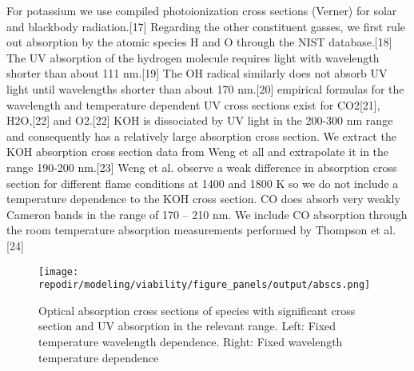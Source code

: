 For potassium we use compiled photoionization cross sections (Verner) for solar and blackbody radiation.{[}17{]} Regarding the other constituent gasses, we first rule out absorption by the atomic species H and O through the NIST database.{[}18{]} The UV absorption of the hydrogen molecule requires light with wavelength shorter than about 111 nm.{[}19{]} The OH radical similarly does not absorb UV light until wavelengths shorter than about 170 nm.{[}20{]} empirical formulas for the wavelength and temperature dependent UV cross sections exist for CO2{[}21{]}, H2O,{[}22{]} and O2.{[}22{]} KOH is dissociated by UV light in the 200-300 nm range and consequently has a relatively large absorption cross section. We extract the KOH absorption cross section data from Weng et all and extrapolate it in the range 190-200 nm.{[}23{]} Weng et al. observe a weak difference in absorption cross section for different flame conditions at 1400 and 1800 K so we do not include a temperature dependence to the KOH cross section. CO does absorb very weakly Cameron bands in the range of 170 -- 210 nm. We include CO absorption through the room temperature absorption measurements performed by Thompson et al.{[}24{]}


\begin{figure}[h]
    \texttt{[image: \\repodir/modeling/viability/figure\_panels/output/abscs.png]} 
    \caption{Optical absorption cross sections of species with significant cross section and UV absorption in the relevant range. Left: Fixed temperature wavelength dependence. Right: Fixed wavelength temperature dependence}
    \label{fig:SI_UV_abscs}
\end{figure}

